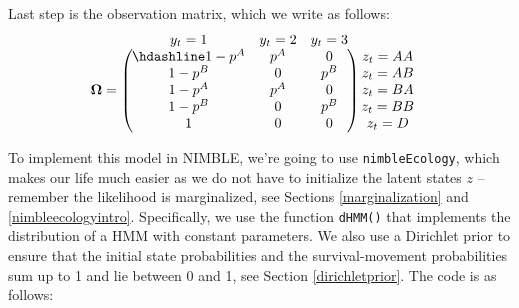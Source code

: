 \documentclass[
  12pt,
]{krantz}
\begin{document}
Last step is the observation matrix, which we write as follows:
\[\begin{matrix}
& \\
\mathbf{\Omega} =
\left ( \vphantom{ \begin{matrix} 12 \\ 12 \\ 12 \\ 12 \\ 12\end{matrix} } \right .
\end{matrix}
\hspace{-1.2em}
\begin{matrix}
y_t=1 & y_t=2 & y_t=3 \\ \hdashline
1 - p^A & p^A & 0\\
1 - p^B & 0 & p^B\\
1 - p^A & p^A & 0\\
1 - p^B & 0 & p^B\\
1 & 0 & 0
\end{matrix}
\hspace{-0.2em}
\begin{matrix}
& \\
\left . \vphantom{ \begin{matrix} 12 \\ 12 \\ 12 \\ 12 \\ 12\end{matrix} } \right )
\begin{matrix}
z_t=AA \\ z_t=AB \\ z_t=BA \\ z_t=BB \\ z_t=D
\end{matrix}
\end{matrix}\]

To implement this model in NIMBLE, we're going to use \texttt{nimbleEcology}, which makes our life much easier as we do not have to initialize the latent states \(z\) -- remember the likelihood is marginalized, see Sections \ref{marginalization} and \ref{nimbleecologyintro}. Specifically, we use the function \texttt{dHMM()} that implements the distribution of a HMM with constant parameters. We also use a Dirichlet prior to ensure that the initial state probabilities and the survival-movement probabilities sum up to 1 and lie between 0 and 1, see Section \ref{dirichletprior}. The code is as follows:
\end{document}
